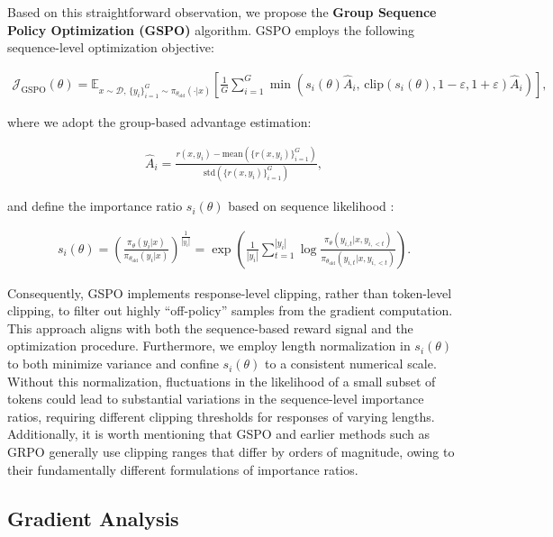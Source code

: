 Based on this straightforward observation, we propose the \textbf{Group Sequence Policy Optimization (GSPO)} algorithm. GSPO employs the following sequence-level optimization objective:

\begin{align}
\mathcal{J}_\text{GSPO} (\theta) =
\mathbb{E}_{ x \sim \mathcal{D},\, \{y_i\}_{i=1}^G \sim \pi_{\theta_\text{old}}( \cdot | x) }
\left[ 
\frac{1}{G} \sum_{i=1}^{G}
\min \left( s_{i}(\theta)  \widehat{A}_{i},  \, \mathrm{clip} \left( s_{i}(\theta), 1 - {\varepsilon}, 1 + {\varepsilon} \right) \widehat{A}_{i} \right) 
\right],
\label{equ:gspo}
\end{align}

where we adopt the group-based advantage estimation:

\begin{align}
\widehat{A}_{i} = \frac{r(x, y_i) - \mathrm{mean} \left( \{ r(x, y_i) \}_{i=1}^G \right) }{ \mathrm{std} \left( \{ r(x, y_i) \}_{i=1}^G \right) },
\end{align}

and define the importance ratio $s_{i}(\theta)$ based on sequence likelihood \citep{click}:

\begin{align}
s_{i}(\theta) = \left( \frac{ \pi_{\theta} (y_i | x) }{ \pi_{\theta_\text{old}} (y_i | x)} \right)^{\frac{1}{|y_i|}}
=
\exp \left( \frac{1}{|y_i|} \sum_{t=1}^{|y_i|} \log \frac{ \pi_{\theta} (y_{i,t} | x, y_{i,<t}) }{ \pi_{\theta_\text{old}} (y_{i,t} | x,y_{i,<t})} \right).
\end{align}

Consequently, GSPO implements response-level clipping, rather than token-level clipping, to filter out highly ``off-policy'' samples from the gradient computation. This approach aligns with both the sequence-based reward signal and the optimization procedure. Furthermore, we employ length normalization in $s_{i}(\theta)$ to both minimize variance and confine $s_{i}(\theta)$ to a consistent numerical scale. Without this normalization, fluctuations in the likelihood of a small subset of tokens could lead to substantial variations in the sequence-level importance ratios, requiring different clipping thresholds for responses of varying lengths. Additionally, it is worth mentioning that GSPO and earlier methods such as GRPO generally use clipping ranges that differ by orders of magnitude, owing to their fundamentally different formulations of importance ratios.

\subsection{Gradient Analysis}
\label{subsec:gradient}

